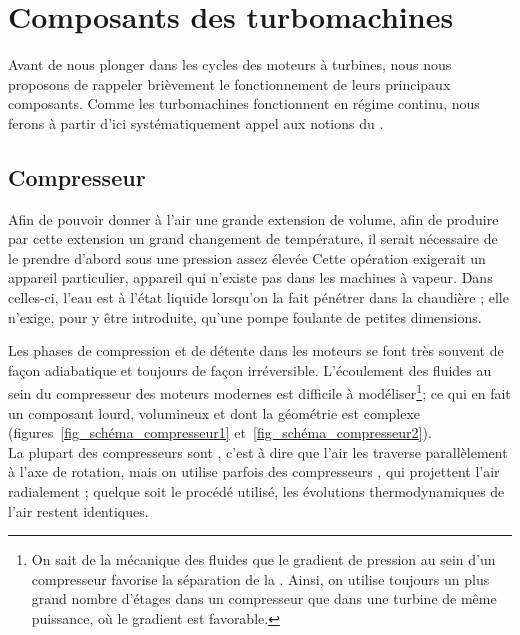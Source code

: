 \section{Composants des turbomachines}

	Avant de nous plonger dans les cycles des moteurs à turbines, nous nous proposons de rappeler brièvement le fonctionnement de leurs principaux composants. Comme les turbomachines fonctionnent en régime continu, nous ferons à partir d’ici systématiquement appel aux notions du \courstrois.

	\subsection{Compresseur}
	
			Afin de pouvoir donner à l’air une grande extension de volume, afin de produire par cette extension un grand changement de température, il serait nécessaire de le prendre d’abord sous une pression assez élevée \jecourte Cette opération exigerait un appareil particulier, appareil qui n’existe pas dans les machines à vapeur. Dans celles-ci, l’eau est à l’état liquide lorsqu’on la fait pénétrer dans la chaudière ; elle n’exige, pour y être introduite, qu’une pompe foulante de petites dimensions.
	
		Les phases de compression et de détente dans les moteurs se font très souvent de façon adiabatique et toujours de façon irréversible. L’écoulement des fluides au sein du compresseur des moteurs modernes est difficile à modéliser\footnote{On sait de la mécanique des fluides que le gradient de pression au sein d’un compresseur favorise la séparation de la . Ainsi, on utilise toujours un plus grand nombre d’étages dans un compresseur que dans une turbine de même puissance, où le gradient est favorable.}\nolinebreak ; ce qui en fait un composant lourd, volumineux et dont la géométrie est complexe (figures~\ref{fig_schéma_compresseur1} et~\ref{fig_schéma_compresseur2}).\\
		La plupart des compresseurs sont , c’est à dire que l’air les traverse parallèlement à l’axe de rotation, mais on utilise parfois des compresseurs , qui projettent l’air radialement ; quelque soit le procédé utilisé, les évolutions thermodynamiques de l’air restent identiques.

